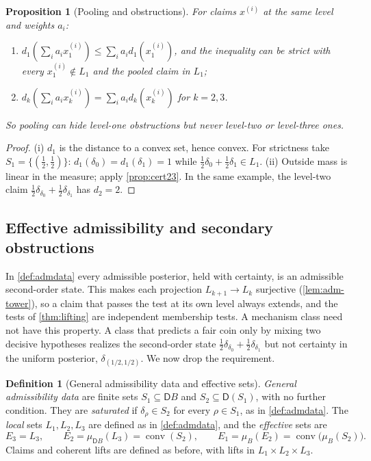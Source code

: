 \documentclass[11pt]{article}
\newtheorem{proposition}[theorem]{Proposition}
\theoremstyle{definition}
\newtheorem{definition}[theorem]{Definition}
\theoremstyle{remark}
\newcommand{\D}{\mathsf{D}}
\begin{document}
\begin{proposition}[Pooling and obstructions]\label{prop:pool-obstr}
For claims $x^{(i)}$ at the same level and weights $a_i$:
\begin{enumerate}[label=(\roman*)]
\item $d_1(\sum_ia_ix_1^{(i)})\le\sum_ia_id_1(x_1^{(i)})$, and the inequality can be strict with
  every $x_1^{(i)}\notin L_1$ and the pooled claim in $L_1$;
\item $d_k(\sum_ia_ix_k^{(i)})=\sum_ia_id_k(x_k^{(i)})$ for $k=2,3$.
\end{enumerate}
So pooling can hide level-one obstructions but never level-two or level-three ones.
\end{proposition}
\begin{proof}
(i) $d_1$ is the distance to a convex set, hence convex. For strictness take $S_1=\{(\tfrac12,\tfrac12)\}$:
$d_1(\delta_0)=d_1(\delta_1)=1$ while $\tfrac12\delta_0+\tfrac12\delta_1\in L_1$. (ii) Outside mass is
linear in the measure; apply \cref{prop:cert23}. In the same example, the level-two claim
$\tfrac12\delta_{\delta_0}+\tfrac12\delta_{\delta_1}$ has $d_2=2$.
\end{proof}

\subsection{Effective admissibility and secondary obstructions}\label{sec:secondary}

In \cref{def:admdata} every admissible posterior, held with certainty, is an admissible second-order
state. This makes each projection $L_{k+1}\to L_k$ surjective (\cref{lem:adm-tower}), so a claim that
passes the test at its own level always extends, and the tests of \cref{thm:lifting} are independent
membership tests. A mechanism class need not have this property. A class that predicts a fair coin
only by mixing two decisive hypotheses realizes the second-order state
$\tfrac12\delta_{\delta_0}+\tfrac12\delta_{\delta_1}$ but not certainty in the uniform posterior,
$\delta_{(1/2,1/2)}$. We now drop the requirement.

\begin{definition}[General admissibility data and effective sets]\label{def:effective}
\emph{General admissibility data} are finite sets $S_1\subseteq\D B$ and $S_2\subseteq\D(S_1)$, with no
further condition. They are \emph{saturated} if $\delta_\rho\in S_2$ for every $\rho\in S_1$, as in
\cref{def:admdata}. The \emph{local} sets $L_1,L_2,L_3$ are defined as in \cref{def:admdata}, and the
\emph{effective} sets are
\[
E_3=L_3,\qquad E_2=\mu_{\D B}(L_3)=\operatorname{conv}(S_2),\qquad
E_1=\mu_B(E_2)=\operatorname{conv}\big(\mu_B(S_2)\big).
\]
Claims and coherent lifts are defined as before, with lifts in $L_1\times L_2\times L_3$.
\end{definition}
\end{document}
